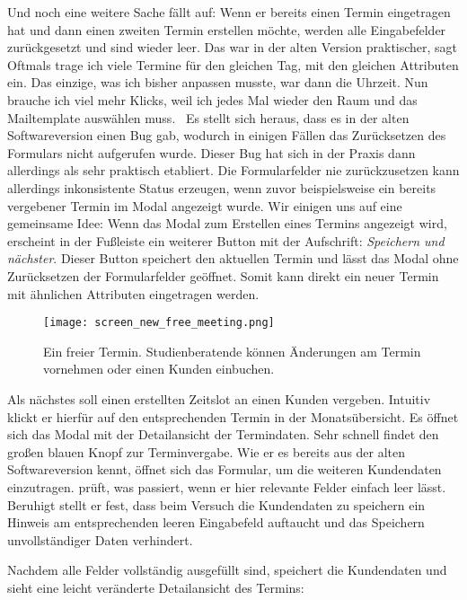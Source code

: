 Und noch eine weitere Sache fällt \ipName auf: Wenn er bereits einen Termin
eingetragen hat und dann einen zweiten Termin erstellen möchte, werden alle
Eingabefelder zurückgesetzt und sind wieder leer. \glqq{}Das war in der alten
Version praktischer\grqq{}, sagt \ipName \glqq{}Oftmals trage ich viele Termine
für den gleichen Tag, mit den gleichen Attributen ein. Das einzige, was ich
bisher anpassen musste, war dann die Uhrzeit. Nun brauche ich viel mehr Klicks,
weil ich jedes Mal wieder den Raum und das Mailtemplate auswählen
muss.\grqq{}~\cite{clavesUsertest} Es stellt sich heraus, dass es in der alten
Softwareversion einen Bug gab, wodurch in einigen Fällen das Zurücksetzen des
Formulars nicht aufgerufen wurde. Dieser Bug hat sich in der Praxis dann
allerdings als sehr praktisch etabliert. Die Formularfelder nie zurückzusetzen
kann allerdings inkonsistente Status erzeugen, wenn zuvor beispielsweise ein
bereits vergebener Termin im Modal angezeigt wurde. Wir einigen uns auf eine
gemeinsame Idee: Wenn das Modal zum Erstellen eines Termins angezeigt wird,
erscheint in der Fußleiste ein weiterer Button mit der Aufschrift:
\textit{Speichern und nächster}. Dieser Button speichert den aktuellen Termin
und lässt das Modal ohne Zurücksetzen der Formularfelder geöffnet. Somit kann
direkt ein neuer Termin mit ähnlichen Attributen eingetragen werden.

\begin{figure}[H]
    \caption{Ein freier Termin. Studienberatende können Änderungen am Termin vornehmen oder einen Kunden einbuchen.}
    \centering
    \texttt{[image: screen\_new\_free\_meeting.png]}
\end{figure}

Als nächstes soll \ipName einen erstellten Zeitslot an einen Kunden vergeben.
Intuitiv klickt er hierfür auf den entsprechenden Termin in der
Monatsübersicht. Es öffnet sich das Modal mit der Detailansicht der
Termindaten. Sehr schnell findet \ipName den großen blauen Knopf zur
Terminvergabe. Wie er es bereits aus der alten Softwareversion kennt, öffnet
sich das Formular, um die weiteren Kundendaten einzutragen. \ipName prüft, was
passiert, wenn er hier relevante Felder einfach leer lässt. Beruhigt stellt er
fest, dass beim Versuch die Kundendaten zu speichern ein Hinweis am
entsprechenden leeren Eingabefeld auftaucht und das Speichern unvollständiger
Daten verhindert.

Nachdem alle Felder vollständig ausgefüllt sind, speichert \ipName die
Kundendaten und sieht eine leicht veränderte Detailansicht des Termins:

